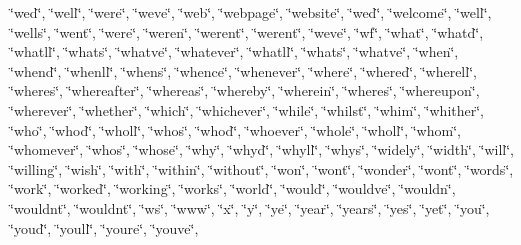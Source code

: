 \char`\"{}we\textquotesingle{}d\char`\"{}, \char`\"{}we\textquotesingle{}ll\char`\"{}, \char`\"{}we\textquotesingle{}re\char`\"{}, \char`\"{}we\textquotesingle{}ve\char`\"{}, \char`\"{}web\char`\"{}, \char`\"{}webpage\char`\"{}, \char`\"{}website\char`\"{}, \char`\"{}wed\char`\"{}, \char`\"{}welcome\char`\"{}, \char`\"{}well\char`\"{}, \char`\"{}wells\char`\"{}, \char`\"{}went\char`\"{}, \char`\"{}were\char`\"{}, \char`\"{}weren\char`\"{}, \char`\"{}weren\textquotesingle{}t\char`\"{}, \char`\"{}werent\char`\"{}, \char`\"{}weve\char`\"{}, \char`\"{}wf\char`\"{}, \char`\"{}what\char`\"{}, \char`\"{}what\textquotesingle{}d\char`\"{}, \char`\"{}what\textquotesingle{}ll\char`\"{}, \char`\"{}what\textquotesingle{}s\char`\"{}, \char`\"{}what\textquotesingle{}ve\char`\"{}, \char`\"{}whatever\char`\"{}, \char`\"{}whatll\char`\"{}, \char`\"{}whats\char`\"{}, \char`\"{}whatve\char`\"{}, \char`\"{}when\char`\"{}, \char`\"{}when\textquotesingle{}d\char`\"{}, \char`\"{}when\textquotesingle{}ll\char`\"{}, \char`\"{}when\textquotesingle{}s\char`\"{}, \char`\"{}whence\char`\"{}, \char`\"{}whenever\char`\"{}, \char`\"{}where\char`\"{}, \char`\"{}where\textquotesingle{}d\char`\"{}, \char`\"{}where\textquotesingle{}ll\char`\"{}, \char`\"{}where\textquotesingle{}s\char`\"{}, \char`\"{}whereafter\char`\"{}, \char`\"{}whereas\char`\"{}, \char`\"{}whereby\char`\"{}, \char`\"{}wherein\char`\"{}, \char`\"{}wheres\char`\"{}, \char`\"{}whereupon\char`\"{}, \char`\"{}wherever\char`\"{}, \char`\"{}whether\char`\"{}, \char`\"{}which\char`\"{}, \char`\"{}whichever\char`\"{}, \char`\"{}while\char`\"{}, \char`\"{}whilst\char`\"{}, \char`\"{}whim\char`\"{}, \char`\"{}whither\char`\"{}, \char`\"{}who\char`\"{}, \char`\"{}who\textquotesingle{}d\char`\"{}, \char`\"{}who\textquotesingle{}ll\char`\"{}, \char`\"{}who\textquotesingle{}s\char`\"{}, \char`\"{}whod\char`\"{}, \char`\"{}whoever\char`\"{}, \char`\"{}whole\char`\"{}, \char`\"{}wholl\char`\"{}, \char`\"{}whom\char`\"{}, \char`\"{}whomever\char`\"{}, \char`\"{}whos\char`\"{}, \char`\"{}whose\char`\"{}, \char`\"{}why\char`\"{}, \char`\"{}why\textquotesingle{}d\char`\"{}, \char`\"{}why\textquotesingle{}ll\char`\"{}, \char`\"{}why\textquotesingle{}s\char`\"{}, \char`\"{}widely\char`\"{}, \char`\"{}width\char`\"{}, \char`\"{}will\char`\"{}, \char`\"{}willing\char`\"{}, \char`\"{}wish\char`\"{}, \char`\"{}with\char`\"{}, \char`\"{}within\char`\"{}, \char`\"{}without\char`\"{}, \char`\"{}won\char`\"{}, \char`\"{}won\textquotesingle{}t\char`\"{}, \char`\"{}wonder\char`\"{}, \char`\"{}wont\char`\"{}, \char`\"{}words\char`\"{}, \char`\"{}work\char`\"{}, \char`\"{}worked\char`\"{}, \char`\"{}working\char`\"{}, \char`\"{}works\char`\"{}, \char`\"{}world\char`\"{}, \char`\"{}would\char`\"{}, \char`\"{}would\textquotesingle{}ve\char`\"{}, \char`\"{}wouldn\char`\"{}, \char`\"{}wouldn\textquotesingle{}t\char`\"{}, \char`\"{}wouldnt\char`\"{}, \char`\"{}ws\char`\"{}, \char`\"{}www\char`\"{}, \char`\"{}x\char`\"{}, \char`\"{}y\char`\"{}, \char`\"{}ye\char`\"{}, \char`\"{}year\char`\"{}, \char`\"{}years\char`\"{}, \char`\"{}yes\char`\"{}, \char`\"{}yet\char`\"{}, \char`\"{}you\char`\"{}, \char`\"{}you\textquotesingle{}d\char`\"{}, \char`\"{}you\textquotesingle{}ll\char`\"{}, \char`\"{}you\textquotesingle{}re\char`\"{}, \char`\"{}you\textquotesingle{}ve\char`\"{}, 